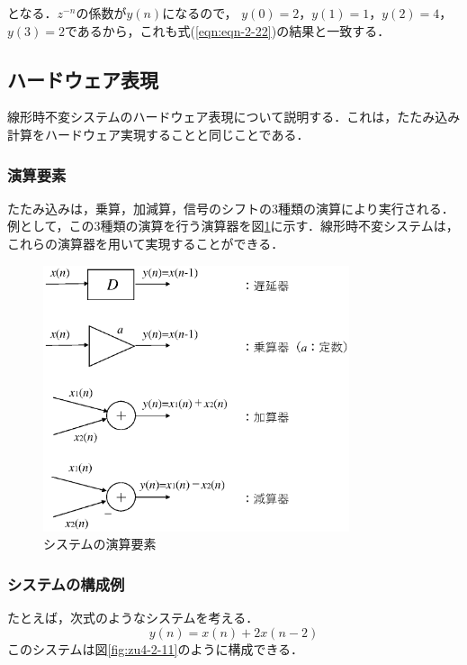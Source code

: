 \noindent となる．$z^{-n}$の係数が$y(n)$になるので，
$y(0)=2$，$y(1)=1$，$y(2)=4$，$y(3)=2$であるから，これも式(\ref{eqn:eqn-2-22})の結果と一致する．


\subsection{ハードウェア表現}

線形時不変システムのハードウェア表現について説明する．これは，たたみ込み計算をハードウェア実現することと同じことである．

\subsubsection{演算要素}

たたみ込みは，乗算，加減算，信号のシフトの3種類の演算により実行される．例として，この3種類の演算を行う演算器を図\ref{fig:zu4-2-10}に示す．線形時不変システムは，これらの演算器を用いて実現することができる．

\begin{figure}[H]
\begin{center}
\includegraphics[width=9cm]{fig/zu-2-10.eps}
\end{center}
\caption{システムの演算要素}
\label{fig:zu4-2-10}
\end{figure}


\subsubsection{システムの構成例}

たとえば，次式のようなシステムを考える．
\begin{equation}
y(n)=x(n)+2x(n-2)
\end{equation}
このシステムは図\ref{fig:zu4-2-11}のように構成できる．

